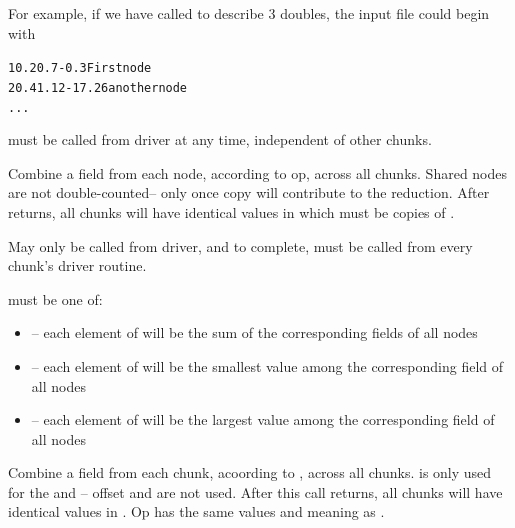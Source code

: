 \documentclass[10pt]{article}
\begin{document}
     For example, if we have called  to describe 3 doubles,
     the input file could begin with

\begin{alltt}
          1    0.2    0.7    -0.3      First node
          2    0.4    1.12   -17.26    another node
          ...
\end{alltt}

      must be called from driver at any time, independent
     of other chunks.


Combine a field from each node, according to op, across all chunks.
Shared nodes are not double-counted-- only once copy will contribute to the
reduction.  After  returns, all chunks will have identical
values in  which must be  copies of .

     May only be called from driver, and to complete, must be called
     from every chunk's driver routine.

      must be one of:

\begin{itemize}
        \item {}-- each element of  will be the sum 
of the corresponding fields of all nodes
        \item {}-- each element of  will be the 
smallest value among the corresponding field of all nodes
        \item {}-- each element of  will be the largest 
value among the corresponding field of all nodes
\end{itemize}



     Combine a field from each chunk, acoording to , across all chunks.
 is only used for the  and -- offset and
 are not used.  After this call returns, all chunks will have
identical values in .  Op has the same values and meaning as
.
\end{document}
